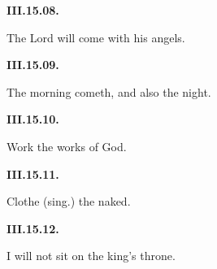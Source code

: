 \par\begin{minipage}{\linewidth}\raggedright
\textbf{III.15.08.}

The Lord will come with his angels.

\end{minipage}\par\addvspace{4pt}

\par\begin{minipage}{\linewidth}\raggedright
\textbf{III.15.09.}

The morning cometh, and also the night.

\end{minipage}\par\addvspace{4pt}

\par\begin{minipage}{\linewidth}\raggedright
\textbf{III.15.10.}

Work the works of God.

\end{minipage}\par\addvspace{4pt}

\par\begin{minipage}{\linewidth}\raggedright
\textbf{III.15.11.}

Clothe (sing.) the naked.

\end{minipage}\par\addvspace{4pt}

\par\begin{minipage}{\linewidth}\raggedright
\textbf{III.15.12.}

I will not sit on the king’s throne.

\end{minipage}\par\addvspace{4pt}

